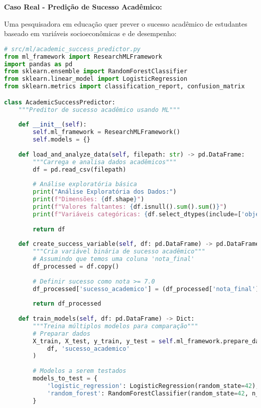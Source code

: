 \begin{researchbox}
\textbf{Caso Real - Predição de Sucesso Acadêmico:}

Uma pesquisadora em educação quer prever o sucesso acadêmico de estudantes baseado em variáveis socioeconômicas e de desempenho:

\begin{lstlisting}[language=Python]
# src/ml/academic_success_predictor.py
from ml_framework import ResearchMLFramework
import pandas as pd
from sklearn.ensemble import RandomForestClassifier
from sklearn.linear_model import LogisticRegression
from sklearn.metrics import classification_report, confusion_matrix

class AcademicSuccessPredictor:
    """Preditor de sucesso acadêmico usando ML"""
    
    def __init__(self):
        self.ml_framework = ResearchMLFramework()
        self.models = {}
        
    def load_and_analyze_data(self, filepath: str) -> pd.DataFrame:
        """Carrega e analisa dados acadêmicos"""
        df = pd.read_csv(filepath)
        
        # Análise exploratória básica
        print("Análise Exploratória dos Dados:")
        print(f"Dimensões: {df.shape}")
        print(f"Valores faltantes: {df.isnull().sum().sum()}")
        print(f"Variáveis categóricas: {df.select_dtypes(include=['object']).columns.tolist()}")
        
        return df
    
    def create_success_variable(self, df: pd.DataFrame) -> pd.DataFrame:
        """Cria variável binária de sucesso acadêmico"""
        # Assumindo que temos uma coluna 'nota_final'
        df_processed = df.copy()
        
        # Definir sucesso como nota >= 7.0
        df_processed['sucesso_academico'] = (df_processed['nota_final'] >= 7.0).astype(int)
        
        return df_processed
    
    def train_models(self, df: pd.DataFrame) -> Dict:
        """Treina múltiplos modelos para comparação"""
        # Preparar dados
        X_train, X_test, y_train, y_test = self.ml_framework.prepare_data(
            df, 'sucesso_academico'
        )
        
        # Modelos a serem testados
        models_to_test = {
            'logistic_regression': LogisticRegression(random_state=42),
            'random_forest': RandomForestClassifier(random_state=42, n_estimators=100)
        }
        

\end{lstlisting}
\end{researchbox}
